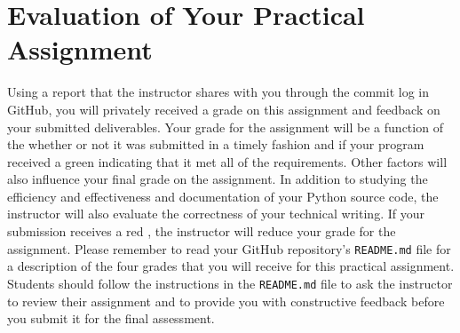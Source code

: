 \documentclass[11pt]{article}
\newcommand{\program}[1]{\lstinline{#1}}
\newcommand{\checkmark}{\ding{51}}
\newcommand{\naughtmark}{\ding{55}}
\begin{document}
\vspace*{-1em}

\section*{Evaluation of Your Practical Assignment}

Using a report that the instructor shares with you through the commit log in
GitHub, you will privately received a grade on this assignment and feedback on
your submitted deliverables. Your grade for the assignment will be a function of
the whether or not it was submitted in a timely fashion and if your program
received a green \checkmark{} indicating that it met all of the requirements.
Other factors will also influence your final grade on the assignment. In
addition to studying the efficiency and effectiveness and documentation of your
Python source code, the instructor will also evaluate the correctness of your
technical writing. If your submission receives a red \naughtmark{}, the
instructor will reduce your grade for the assignment. Please remember to read
your GitHub repository's \program{README.md} file for a description of the four
grades that you will receive for this practical assignment. Students should
follow the instructions in the \program{README.md} file to ask the instructor to
review their assignment and to provide you with constructive feedback before you
submit it for the final assessment.
\end{document}
